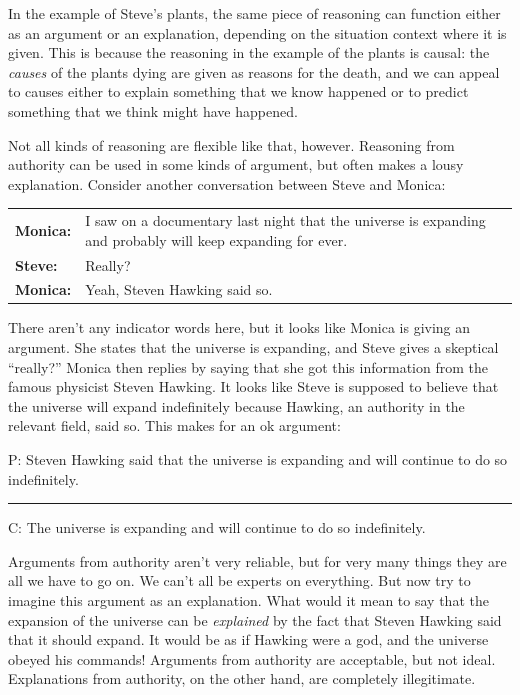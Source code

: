 In the example of Steve's plants, the same piece of reasoning can function either as an argument or an explanation, depending on the situation context where it is given. This is because the reasoning in the example of the plants is causal: the \textit{causes} of the plants dying are given as reasons for the death, and we can appeal to causes either to explain something that we know happened or to predict something that we think might have happened. 

Not all kinds of reasoning are flexible like that, however. Reasoning from authority can be used in some kinds of argument, but often makes a lousy explanation. Consider another conversation between Steve and Monica:

\begin{adjustwidth}{2em}{0em}
\begin{longtabu}{p{.1\linewidth}p{.8\linewidth}}
\textbf{Monica:} & I saw on a documentary last night that the universe is expanding and probably will keep expanding for ever. \\
\textbf{Steve:} & Really?\\
\textbf{Monica:} &Yeah, Steven Hawking said so. \\
\end{longtabu}
\end{adjustwidth}
\vspace{-1cm}

There aren't any indicator words here, but it looks like Monica is giving an argument. She states that the universe is expanding, and Steve gives a skeptical ``really?'' Monica then replies by saying that she got this information from the famous physicist Steven Hawking. It looks like Steve is supposed to believe that the universe will expand indefinitely because Hawking, an authority in the relevant field, said so. This makes for an ok argument: 

 \begin{earg}
\item[P:] Steven Hawking said that the universe is expanding and will continue to do so indefinitely.
\vspace{-.5em}
\item [] \rule{\linewidth}{.5pt} 
\item[C:] The universe is expanding and will continue to do so indefinitely.
\end{earg} 

Arguments from authority aren't very reliable, but for very many things they are all we have to go on. We can't all be experts on everything. But now try to imagine this argument as an explanation. What would it mean to say that the expansion of the universe can be \textit{explained} by the fact that Steven Hawking said that it should expand. It would be as if Hawking were a god, and the universe obeyed his commands! Arguments from authority are acceptable, but not ideal. Explanations from authority, on the other hand, are completely illegitimate. \label{no_exp_from_authority}

